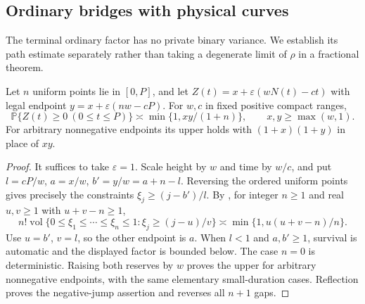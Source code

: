 \subsection{Ordinary bridges with physical curves}

The terminal ordinary factor has no private binary variance. We establish
its path estimate separately rather than taking a degenerate limit of
$\rho$ in a fractional theorem.

\begin{lemma}\label{bridge:ordinary-flat}
Let $n$ uniform points lie in $[0,P]$, and let
$Z(t)=x+\varepsilon(wN(t)-ct)$ with legal endpoint
$y=x+\varepsilon(nw-cP)$. For $w,c$ in fixed positive compact ranges,
\[
 \mathbb P\{Z(t)\ge0\ (0\le t\le P)\}
 \asymp\min\{1,xy/(1+n)\},\qquad x,y\ge\max(w,1).
\]
For arbitrary nonnegative endpoints its upper holds with
$(1+x)(1+y)$ in place of $xy$.
\end{lemma}
\begin{proof}
It suffices to take $\varepsilon=1$. Scale height by $w$ and time
by $w/c$, and put $l=cP/w$, $a=x/w$, $b'=y/w=a+n-l$.
Reversing the ordered uniform points gives precisely the constraints
$\xi_j\ge(j-b')/l$. By \cite[Lemma~8.3, pp.~53--54]{Kouk}, for
integer $n\ge1$ and real $u,v\ge1$ with $u+v-n\ge1$,
\[
 n!\operatorname{vol}\{0\le\xi_1\le\cdots\le\xi_n\le1:
                      \xi_j\ge(j-u)/v\}
 \asymp\min\{1,u(u+v-n)/n\}.
\]
Use $u=b'$, $v=l$, so the other endpoint is $a$. When $l<1$
and $a,b'\ge1$, survival is automatic and the displayed factor is
bounded below. The case $n=0$ is deterministic. Raising both reserves
by $w$ proves the upper for arbitrary nonnegative endpoints, with
the same elementary small-duration cases. Reflection proves the
negative-jump assertion and reverses all $n+1$ gaps.
\end{proof}

